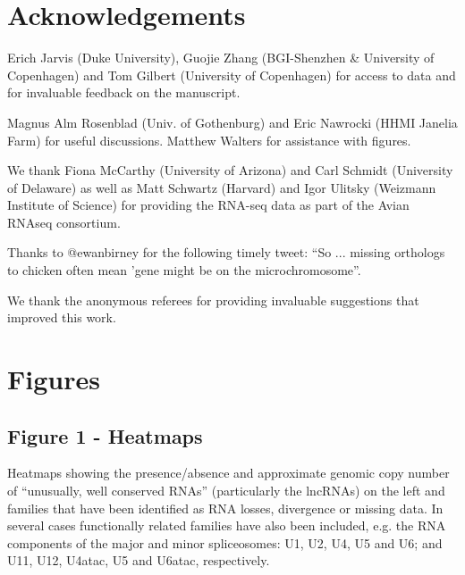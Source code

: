 \documentclass[10pt]{bmc_article}
\newenvironment{bmcformat}{\begin{raggedright}\baselineskip20pt\sloppy\setboolean{publ}{false}}{\end{raggedright}\baselineskip20pt\sloppy}
\begin{document}
\begin{bmcformat}
\section*{Acknowledgements}

Erich Jarvis (Duke University), Guojie Zhang (BGI-Shenzhen \&
University of Copenhagen) and Tom Gilbert (University of Copenhagen)
for access to data and for invaluable feedback on the manuscript.

Magnus Alm Rosenblad (Univ. of Gothenburg) and Eric Nawrocki (HHMI
Janelia Farm) for useful discussions. Matthew Walters for assistance
with figures.

We thank Fiona McCarthy (University of Arizona) and Carl
Schmidt (University of Delaware) as well as Matt Schwartz (Harvard)
and Igor Ulitsky (Weizmann Institute of Science) for providing the
RNA-seq data as part of the Avian RNAseq consortium.

Thanks to @ewanbirney for the following timely tweet: ``So ... missing
orthologs to chicken often mean 'gene might be on the
microchromosome''.


We thank the anonymous referees for providing invaluable suggestions
that improved this work. 



{
  } %


\clearpage
\newpage

\section*{Figures}
  \subsection*{Figure 1 - Heatmaps}

Heatmaps showing the presence/absence and approximate genomic copy
number of ``unusually, well conserved RNAs'' (particularly the
lncRNAs) on the left and families that have been identified as
RNA losses, divergence or missing data. In several cases
functionally related families have also been included, e.g. the RNA
components of the major and minor spliceosomes: U1, U2, U4, U5 and U6;
and U11, U12, U4atac, U5 and U6atac, respectively.\label{fig:1}


\end{bmcformat}
\end{document}

